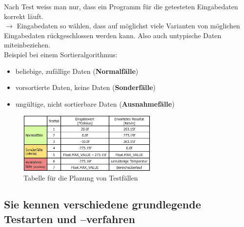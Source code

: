 \documentclass[a4paper]{article}
\begin{document}
			Nach Test weiss man nur, dass ein Programm für die getesteten Eingabedaten korrekt läuft.\\
			$\rightarrow$ Eingabedaten so wählen, dass auf möglichst viele Varianten von möglichen Eingabedaten rückgeschlossen werden kann. 
			Also auch untypische Daten miteinbeziehen.\\
			Beispiel bei einem Sortieralgorithmus:
			\begin{itemize}
				\item beliebige, zufällige Daten (\textbf{Normalfälle})
				\item vorsortierte Daten, keine Daten (\textbf{Sonderfälle})
				\item ungültige, nicht sortierbare Daten (\textbf{Ausnahmefälle})
			\end{itemize}
			
			\begin{figure}[htb!]
				\centering
				\includegraphics[keepaspectratio, height=3cm]{img/testing/planungstabelle.png}
				\caption{Tabelle für die Planung von Testfällen}
				\label{fig:table_testing}
			\end{figure}
			
			
		
		\subsection{Sie kennen verschiedene grundlegende Testarten und –verfahren}
		
\end{document}
